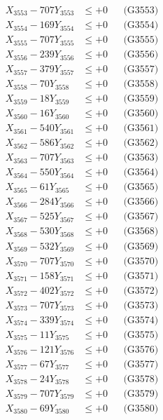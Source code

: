 \documentclass[a4paper,10pt]{article}
\begin{document}
{\begin{align}
X_{3553} - 707Y_{3553} &\leq +0 && \text{(G3553)} \\
X_{3554} - 169Y_{3554} &\leq +0 && \text{(G3554)} \\
X_{3555} - 707Y_{3555} &\leq +0 && \text{(G3555)} \\
X_{3556} - 239Y_{3556} &\leq +0 && \text{(G3556)} \\
X_{3557} - 379Y_{3557} &\leq +0 && \text{(G3557)} \\
X_{3558} - 70Y_{3558} &\leq +0 && \text{(G3558)} \\
X_{3559} - 18Y_{3559} &\leq +0 && \text{(G3559)} \\
X_{3560} - 16Y_{3560} &\leq +0 && \text{(G3560)} \\
\allowbreak
X_{3561} - 540Y_{3561} &\leq +0 && \text{(G3561)} \\
X_{3562} - 586Y_{3562} &\leq +0 && \text{(G3562)} \\
X_{3563} - 707Y_{3563} &\leq +0 && \text{(G3563)} \\
X_{3564} - 550Y_{3564} &\leq +0 && \text{(G3564)} \\
X_{3565} - 61Y_{3565} &\leq +0 && \text{(G3565)} \\
X_{3566} - 284Y_{3566} &\leq +0 && \text{(G3566)} \\
X_{3567} - 525Y_{3567} &\leq +0 && \text{(G3567)} \\
X_{3568} - 530Y_{3568} &\leq +0 && \text{(G3568)} \\
X_{3569} - 532Y_{3569} &\leq +0 && \text{(G3569)} \\
X_{3570} - 707Y_{3570} &\leq +0 && \text{(G3570)} \\
\allowbreak
X_{3571} - 158Y_{3571} &\leq +0 && \text{(G3571)} \\
X_{3572} - 402Y_{3572} &\leq +0 && \text{(G3572)} \\
X_{3573} - 707Y_{3573} &\leq +0 && \text{(G3573)} \\
X_{3574} - 339Y_{3574} &\leq +0 && \text{(G3574)} \\
X_{3575} - 11Y_{3575} &\leq +0 && \text{(G3575)} \\
X_{3576} - 121Y_{3576} &\leq +0 && \text{(G3576)} \\
X_{3577} - 67Y_{3577} &\leq +0 && \text{(G3577)} \\
X_{3578} - 24Y_{3578} &\leq +0 && \text{(G3578)} \\
X_{3579} - 707Y_{3579} &\leq +0 && \text{(G3579)} \\
X_{3580} - 69Y_{3580} &\leq +0 && \text{(G3580)} \\

\end{align}}
\end{document}
